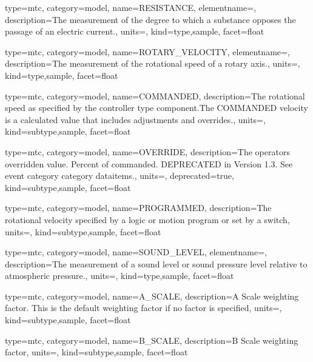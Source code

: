 {
  type=mtc,
  category=model,
  name={RESISTANCE},
  elementname=,
  description={The measurement of the degree to which a substance opposes the passage of an electric current.},
  units=,
  kind={type,sample},
  facet={\gls{float}}
}


{
  type=mtc,
  category=model,
  name={ROTARY\_VELOCITY},
  elementname=,
  description={The measurement of the rotational speed of a rotary axis.},
  units=,
  kind={type,sample},
  facet={\gls{float}}
}


{
  type=mtc,
  category=model,
  name={COMMANDED},
  description={The rotational speed as specified by the \gls{controller} type component.The COMMANDED velocity is a calculated value that includes adjustments and overrides.},
  units=,
  kind={subtype,sample},
  facet={\gls{float}}
}


{
  type=mtc,
  category=model,
  name={OVERRIDE},
  description={The operators overridden value.  Percent of commanded. DEPRECATED in Version 1.3.   See \gls{event category} category \glspl{dataitem}.},
  units=,
  deprecated={true},
  kind={subtype,sample},
  facet={\gls{float}}
}


{
  type=mtc,
  category=model,
  name={PROGRAMMED},
  description={The rotational velocity specified by a logic or motion program or set by a switch},
  units=,
  kind={subtype,sample},
  facet={\gls{float}}
}


{
  type=mtc,
  category=model,
  name={SOUND\_LEVEL},
  elementname=,
  description={The measurement of a sound level or sound pressure level relative to atmospheric pressure.},
  units=,
  kind={type,sample},
  facet={\gls{float}}
}


{
  type=mtc,
  category=model,
  name={A\_SCALE},
  description={A Scale weighting factor.   This is the default weighting factor if no factor is specified},
  units=,
  kind={subtype,sample},
  facet={\gls{float}}
}


{
  type=mtc,
  category=model,
  name={B\_SCALE},
  description={B Scale weighting factor},
  units=,
  kind={subtype,sample},
  facet={\gls{float}}
}



